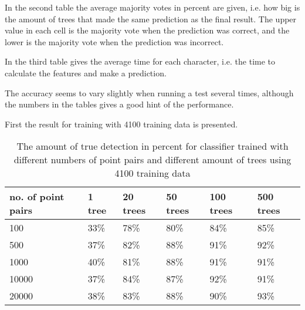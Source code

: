 In the second table the average majority votes in percent are given, i.e. how big is the amount of trees that made the same prediction as the final result. The upper value in each cell is the majority vote when the prediction was correct, and the lower is the majority vote when the prediction was incorrect. 

In the third table gives the average time for each character, i.e. the time to calculate the features and make a prediction.

The accuracy seems to vary slightly when running a test several times, although the numbers in the tables gives a good hint of the performance.

First the result for training with 4100 training data is presented.
 
\begin{table}[H]
\begin{center}
     \begin{tabular}{| l | l | l | l | l | l | }
     \hline
     no. of point pairs & 1 tree & 20 trees & 50 trees & 100 trees & 500 trees \\ \hline
   	 100 & 33\% & 78\% & 80\% & 84\% & 85\% 	\\ \hline
     500 & 37\% & 82\% & 88\% & 91\% & 92\%	\\ \hline
     1000 & 40\% & 81\% & 88\% & 91\% & 91\% \\ \hline
     10000 & 37\% & 84\% & 87\% & 92\% & 91\%	\\ \hline
     20000 & 38\% & 83\% & 88\% & 90\% & 93\% 	\\ \hline
     \end{tabular}
\end{center}
\caption{The amount of true detection in percent for classifier trained with different numbers of point pairs and different amount of trees using 4100 training data}
\end{table}


